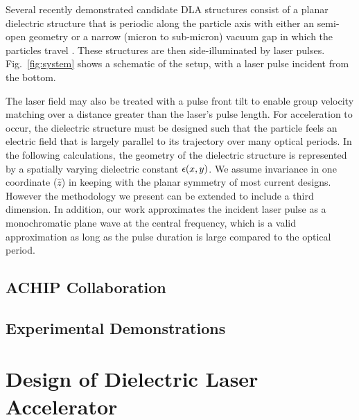 Several recently demonstrated candidate DLA structures consist of a planar dielectric structure that is periodic along the particle axis with either an semi-open geometry or a narrow (micron to sub-micron) vacuum gap in which the particles travel \cite{plettner2006proposed, peralta2013demonstration, mcneur2016elements, leedle2015dielectric, chang2014silicon, breuer2014dielectric, breuer2014dielectric2, kozak2016dielectric}.
These structures are then side-illuminated by laser pulses. Fig.~\ref{fig:system} shows a schematic of the setup, with a laser pulse incident from the bottom.


The laser field may also be treated with a pulse front tilt \cite{hebling1996derivation, akturk2004pulse} to enable group velocity matching over a distance greater than the laser's pulse length.
For acceleration to occur, the dielectric structure must be designed such that the particle feels an electric field that is largely parallel to its trajectory over many optical periods.
In the following calculations, the geometry of the dielectric structure is represented by a spatially varying dielectric constant $\epsilon(x,y)$.  We assume invariance in one coordinate ($\hat{z}$) in keeping with the planar symmetry of most current designs.
However the methodology we present can be extended to include a third dimension.
In addition, our work approximates the incident laser pulse as a monochromatic plane wave at the central frequency, which is a valid approximation as long as the pulse duration is large compared to the optical period.

\subsection{ACHIP Collaboration}
\subsection{Experimental Demonstrations}

\section{Design of Dielectric Laser Accelerator}

